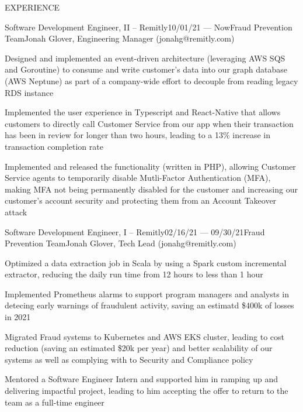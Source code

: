 \documentclass{resume} %
\begin{document}

\begin{rSection}{EXPERIENCE}

\begin{rSubsection}{Software Development Engineer, II  -- Remitly}{10/01/21 --- Now}{Fraud Prevention Team}{Jonah Glover, Engineering Manager (jonahg@remitly.com)}
    
    \item Designed and implemented an event-driven architecture (leveraging AWS SQS and Goroutine) to consume and write customer's data into our graph database (AWS Neptune) as part of a company-wide effort to decouple from reading legacy RDS instance
    \item Implemented the user experience in Typescript and React-Native that allows customers to directly call Customer Service from our app when their transaction has been in review for longer than two hours, leading to a 13\% increase in transaction  completion rate
    \item Implemented and released the functionality (written in PHP), allowing Customer Service agents to temporarily disable Mutli-Factor Authentication (MFA), making MFA not being permanently disabled for the customer and increasing our customer's account security and protecting them from an Account Takeover attack

\end{rSubsection}

\begin{rSubsection}{Software Development Engineer, I -- Remitly}{02/16/21 --- 09/30/21}{Fraud Prevention Team}{Jonah Glover, Tech Lead (jonahg@remitly.com)}
    
    \item Optimized a data extraction job in Scala by using a Spark custom incremental extractor, reducing the daily run time from 12 hours to less than 1 hour
    \item Implemented Prometheus alarms to support program managers and analysts in detecing early warnings of fraudulent activity, saving an estimatd \$400k of losses in 2021
    \item Migrated Fraud systems to Kubernetes and AWS EKS cluster, leading to cost reduction (saving an estimated \$20k per year) and better scalability of our systems as well as complying with to Security and Compliance policy 
    \item Mentored a Software Engineer Intern and supported him in ramping up and delivering impactful project, leading to him accepting the offer to return to the team as a full-time engineer


\end{rSubsection}
\end{rSection}
\end{document}
